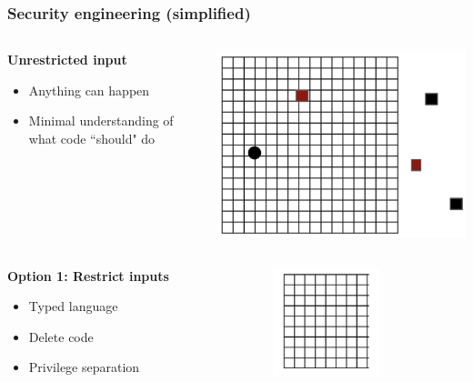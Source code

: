 \documentclass{beamer}
\begin{document}
\begin{frame}
	\frametitle{Security engineering (simplified)}

	\begin{columns}[onlytextwidth]
		\begin{column}{.5\textwidth}

			\textbf{Unrestricted input} 
		\begin{itemize}
			\item{Anything can happen}
			\item{Minimal understanding of what code ``should" do}
		\end{itemize}
		\end{column}
		
		\begin{column}{.5\textwidth}
		\centering \includegraphics[scale=.43]{unrestricted}
		\end{column}
	\end{columns}
	
	\pause
	\vspace{.5\baselineskip}

	\begin{columns}[onlytextwidth]
		\begin{column}{.5\textwidth}
			\textbf{Option 1: Restrict inputs} \begin{itemize}
		\item{Typed language}
		\item{Delete code}
		\item{Privilege separation}
	\end{itemize}
		\end{column}
		\begin{column}{.5\textwidth}
			\centering \includegraphics[scale=.5]{restricted}
		\end{column}
	\end{columns}


\end{frame}
\end{document}
